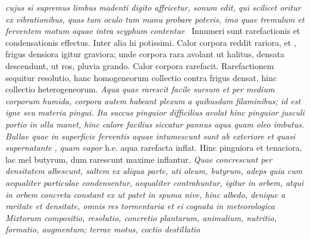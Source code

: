 \textit{cujus si supremus limbus\protect{} madenti digito affricetur, sonum edit, qui scilicet oritur ex vibrationibus, quas tum oculo tum manu probare poteris, imo quae tremulum et ferventem motum aquae intra scyphum contentae }
\pend
\count{}
\count{}
\pstart
{} \, Innumeri sunt rarefactionis\protect{} et condensationis\protect{} effectus. Inter alia hi potissimi. Calor corpora reddit rariora, et , frigus\protect{} densiora igitur graviora; unde corpora rara avolant ut halitus\protect{}, densata descendunt, ut ros, pluvia grando. Calor corpora rarefacit. Rarefactionem sequitur resolutio\protect{}, hanc homogeneorum collectio\protect{} contra frigus densat, hinc collectio heterogeneorum\protect{}.
\textit{Aqua quae rarescit facile sursum  et per medium corporum  humida, corpora autem habeant plexum a quibusdam filaminibus; id est igne seu materia pingui\protect{}. Ita succus pinguior difficilius avolat hinc pinguior jusculi portio in olla manet, hinc calore facilius siccatur pannus aqua quam oleo imbutus. Bullae quae in superficie ferventis aquae intumescunt sunt ab exteriore et quasi supernatante}
\textit{,
quam vapor } h.e. aqua rarefacta\protect{} inflat. Hinc pinguiora et tenaciora, lac\protect{} mel butyrum\protect{}, dum rarescunt maxime inflantur.
\textit{Quae concrescunt per densitatem albescunt, saltem ex aliqua parte, uti oleum\protect{}, butyrum, adeps  quia cum aequaliter particulae condensentur, aequaliter contrahuntur, igitur in orbem, atqui in orbem concreta constant ex  ut patet in spuma nive\protect{}, hinc albedo, denique a raritate et densitate, omnis res tormentaria et ei cognata in meteorologica\protect{} Mixtorum compositio, resolutio, concretio plantarum\protect{}, animalium\protect{}, nutritio, formatio, augmentum; terrae motus, coctio destillatio }

